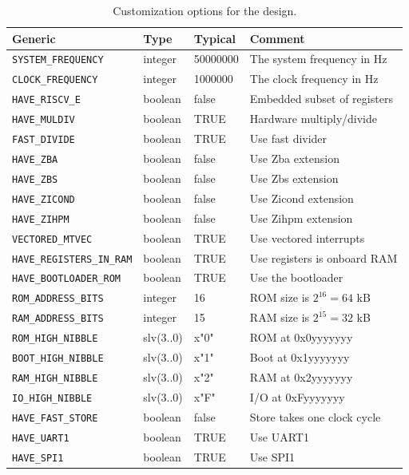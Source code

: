 \documentclass[12pt]{article}
\begin{document}
\begin{table}[!ht]
\caption{Customization options for the design.}
\label{tab:custom}
\centering
\begin{tabular}{lllp{5.5cm}}
\toprule
Generic & Type & Typical & Comment \\
\midrule
\lstinline|SYSTEM_FREQUENCY| & integer & 50000000 & The system frequency in Hz \\
\lstinline|CLOCK_FREQUENCY| & integer & 1000000 & The clock frequency in Hz \\
\lstinline|HAVE_RISCV_E| & boolean & false & Embedded subset of registers\\
\lstinline|HAVE_MULDIV| & boolean & TRUE &  Hardware multiply/divide \\
\lstinline|FAST_DIVIDE| & boolean & TRUE & Use fast divider\\
\lstinline|HAVE_ZBA| & boolean & false & Use Zba extension \\
\lstinline|HAVE_ZBS| & boolean & false & Use Zbs extension \\
\lstinline|HAVE_ZICOND| & boolean & false & Use Zicond extension \\
\lstinline|HAVE_ZIHPM| & boolean & false & Use Zihpm extension \\
\lstinline|VECTORED_MTVEC| & boolean & TRUE & Use vectored interrupts\\
\lstinline|HAVE_REGISTERS_IN_RAM| & boolean & TRUE & Use registers is onboard RAM\\
\lstinline|HAVE_BOOTLOADER_ROM| & boolean & TRUE & Use the bootloader\\
\lstinline|ROM_ADDRESS_BITS| & integer & 16 & ROM size is $2^{16} = 64$ kB \\
\lstinline|RAM_ADDRESS_BITS| & integer & 15 & RAM size is $2^{15} = 32$ kB \\
\lstinline|ROM_HIGH_NIBBLE| & slv(3..0) & x"0" & ROM at 0x0yyyyyyy\\
\lstinline|BOOT_HIGH_NIBBLE| & slv(3..0) & x"1" & Boot at 0x1yyyyyyy\\
\lstinline|RAM_HIGH_NIBBLE| & slv(3..0) & x"2" & RAM at 0x2yyyyyyy\\
\lstinline|IO_HIGH_NIBBLE| & slv(3..0) & x"F" & I/O at 0xFyyyyyyy\\
\lstinline|HAVE_FAST_STORE| & boolean & false & Store takes one clock cycle \\
\lstinline|HAVE_UART1| & boolean & TRUE & Use UART1 \\
\lstinline|HAVE_SPI1| & boolean & TRUE & Use SPI1 \\

\end{tabular}
\end{table}
\end{document}
